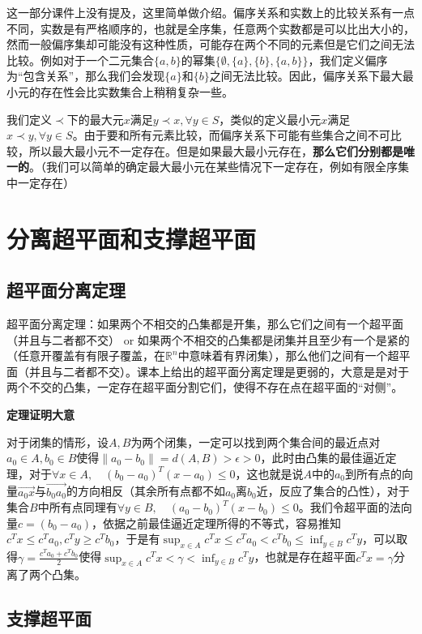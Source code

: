 \documentclass[12pt,a4paper]{book}
\begin{document}
这一部分课件上没有提及，这里简单做介绍。偏序关系和实数上的比较关系有一点不同，实数是有严格顺序的，也就是全序集，任意两个实数都是可以比出大小的，然而一般偏序集却可能没有这种性质，可能存在两个不同的元素但是它们之间无法比较。例如对于一个二元集合$\{a,b\}$的幂集$\{\emptyset,\{a\},\{b\},\{a,b\}\}$，我们定义偏序为“包含关系”，那么我们会发现$\{a\}$和$\{b\}$之间无法比较。因此，偏序关系下最大最小元的存在性会比实数集合上稍稍复杂一些。

我们定义$\prec$下的最大元$x$满足$y\prec x ,\forall y\in S$，类似的定义最小元$x$满足$x\prec y,\forall y\in S$。由于要和所有元素比较，而偏序关系下可能有些集合之间不可比较，所以最大最小元不一定存在。但是如果最大最小元存在，\textbf{那么它们分别都是唯一的}。（我们可以简单的确定最大最小元在某些情况下一定存在，例如有限全序集中一定存在）

\section{分离超平面和支撑超平面}

\subsection{超平面分离定理}
超平面分离定理：如果两个不相交的凸集都是开集，那么它们之间有一个超平面（并且与二者都不交） or 如果两个不相交的凸集都是闭集并且至少有一个是紧的（任意开覆盖有有限子覆盖，在$\mathbb{R}^n$中意味着有界闭集），那么他们之间有一个超平面（并且与二者都不交）。课本上给出的超平面分离定理是更弱的，大意是是对于两个不交的凸集，一定存在超平面分割它们，使得不存在点在超平面的“对侧”。

\textbf{定理证明大意}

对于闭集的情形，设$A,B$为两个闭集，一定可以找到两个集合间的最近点对$a_0\in A,b_0\in B$使得$\|a_0-b_0\|=d(A,B)> \epsilon > 0$，此时由凸集的最佳逼近定理，对于$\forall x\in A, \quad (b_0-a_0)^T(x-a_0)\leq 0$，这也就是说$A$中的$a_0$到所有点的向量$\overrightarrow{a_0x}$与$\overrightarrow{b_0a_0}$的方向相反（其余所有点都不如$a_0$离$b_0$近，反应了集合的凸性），对于集合$B$中所有点同理有$\forall y\in B, \quad (a_0-b_0)^T(x-b_0)\leq 0$。我们令超平面的法向量$c=(b_0-a_0)$，依据之前最佳逼近定理所得的不等式，容易推知$c^Tx\leq c^T a_0,c^Ty\geq c^T b_0$，于是有$\sup_{x\in A} c^Tx \leq c^Ta_0<c^Tb_0\leq \inf_{y\in B}c^Ty$，可以取得$\gamma = \frac{c^Ta_0+c^Tb_0}{2}$使得$\sup_{x\in A} c^Tx <\gamma< \inf_{y\in B}c^Ty$，也就是存在超平面$c^Tx=\gamma$分离了两个凸集。

\subsection{支撑超平面}
\end{document}
